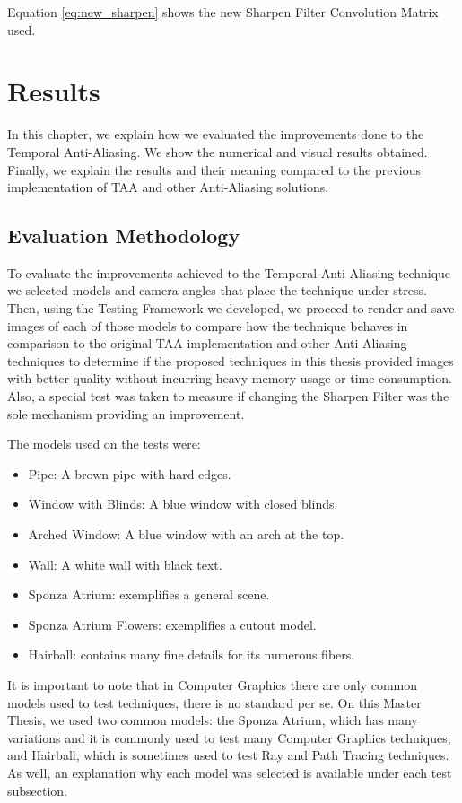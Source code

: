 \documentclass{cslthse-msc}
\begin{document}
Equation \ref{eq:new_sharpen} shows the new Sharpen Filter Convolution Matrix used.


\chapter{Results}
In this chapter, we explain how we evaluated the improvements done to the Temporal Anti-Aliasing. We show the numerical and visual results obtained. Finally, we explain the results and their meaning compared to the previous implementation of TAA and other Anti-Aliasing solutions.
\section{Evaluation Methodology}
To evaluate the improvements achieved to the Temporal Anti-Aliasing technique we selected models and camera angles that place the technique under stress. Then, using the Testing Framework we developed, we proceed to render and save images of each of those models to compare how the technique behaves in comparison to the original TAA implementation and other Anti-Aliasing techniques to determine if the proposed techniques in this thesis provided images with better quality without incurring heavy memory usage or time consumption. Also, a special test was taken to measure if changing the Sharpen Filter was the sole mechanism providing an improvement.

The models used on the tests were:
\begin{itemize}
\item Pipe: A brown pipe with hard edges.
\item Window with Blinds: A blue window with closed blinds.
\item Arched Window: A blue window with an arch at the top.
\item Wall: A white wall with black text.
\item Sponza Atrium: exemplifies a general scene.
\item Sponza Atrium Flowers: exemplifies a cutout model.
\item Hairball: contains many fine details for its numerous fibers.
\end{itemize}

It is important to note that in Computer Graphics there are only common models used to test techniques, there is no standard per se. On this Master Thesis, we used two common models: the Sponza Atrium, which has many variations and it is commonly used to test many Computer Graphics techniques; and Hairball, which is sometimes used to test Ray and Path Tracing techniques. As well, an explanation why each model was selected is available under each test subsection.
\end{document}
